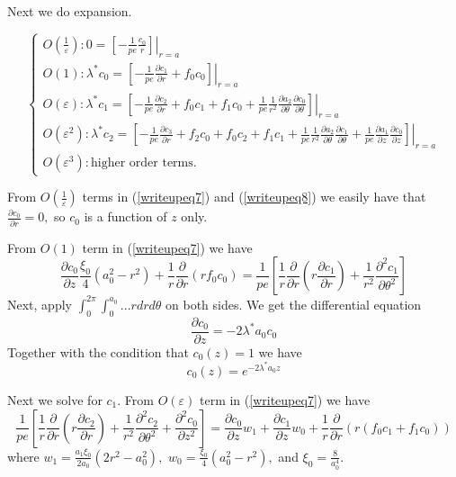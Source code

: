 \documentclass[12pt]{article}
\renewcommand{\(}{\left (}
\renewcommand{\)}{\right )}
\begin{document}
Next we do expansion.

\begin{equation}
	\begin{cases}
		O(\frac{1}{\varepsilon}): 0 = \left.\left[-\frac{1}{pe}\frac{c_0}{r}\right]\right|_{r={a}}\\
		O(1): \lambda^* c_0 = \left.\left[-\frac{1}{pe}\frac{\partial c_{1}}{\partial r}+f_{0} c_{0}\right]\right|_{r={a}}\\
		O(\varepsilon): \lambda^* c_1 = \left.\left[ -\frac{1}{pe} \frac{\partial c_{2}}{\partial r}+f_{0} c_{1}+f_{1} c_{0}+\frac{1}{pe} \frac{1}{r^{2}} \frac{\partial a_{2}}{\partial \theta} \frac{\partial c_{0}}{\partial \theta}\right]\right|_{r={a}}\\
		O(\varepsilon^2): \lambda^* c_2 = \left.\left[ -\frac{1}{pe} \frac{\partial c_3}{\partial r}+f_{2} c_{0}+f_{0} c_{2} + f_1 c_1 + \frac{1}{pe}\frac{1}{r^{2}} \frac{\partial a_{2}}{\partial \theta} \frac{\partial c_{1}}{\partial \theta} + \frac{1}{pe} \frac{\partial a_1 }{\partial z} \frac{\partial c_0 }{\partial z}\right]\right|_{r={a}}\\
		O(\varepsilon^3): \text{higher order terms.}
	\end{cases}
	\label{writeupeq8}
\end{equation}

From $O(\frac{1}{\varepsilon})$ terms in (\ref{writeupeq7}) and (\ref{writeupeq8}) we easily have that $\frac{\partial c_0}{\partial r} = 0,$ so $c_0$ is a function of $z$ only.

From $O(1)$ term in (\ref{writeupeq7}) we have
\begin{equation}
    \frac{\partial c_0}{\partial z} \frac{\xi_0}{4}(a_0^2 - r^2) + \frac{1}{r}\frac{\partial}{\partial r}(r f_0 c_0) = \frac{1}{pe} \left[\frac{1}{r} \frac{\partial}{\partial r}\left( r \frac{\partial c_1}{\partial r} \right) + \frac{1}{r^2}\frac{\partial^2 c_1}{\partial \theta^2} \right]
\end{equation}
Next, apply $\int_0^{2\pi} \int_0^{a_0} ... rdrd\theta$ on both sides. We get the differential equation
\begin{equation}
    \frac{\partial c_0}{\partial z} = -2\lambda^* a_0 c_0
\end{equation}
Together with the condition that $c_0(z) = 1$ we have
\begin{equation}
    c_0(z) = e^{-2\lambda^* a_0 z}
\end{equation}

Next we solve for $c_1.$
From $O(\varepsilon)$ term in (\ref{writeupeq7}) we have
\begin{equation}
    \frac{1}{pe}\left[ \frac{1}{r}\frac{\partial}{\partial r}\left(r \frac{\partial c_2}{\partial r}\right) + \frac{1}{r^2} \frac{\partial^2 c_2}{\partial \theta^2} + \frac{\partial^2 c_0}{\partial z^2}\right] = \frac{\partial c_0}{\partial z}w_1 + \frac{\partial c_1}{\partial z} w_0 + \frac{1}{r } \frac{\partial}{\partial r} (r (f_0 c_1 + f_1 c_0))
\end{equation}
where $w_1 = \frac{a_1 \xi_0}{2 a_0}(2r^2-a_0^2),$ $w_0 = \frac{\xi_0}{4}(a_0^2 - r^2),$ and $\xi_0 = \frac{8}{a_0^4}.$
\end{document}
